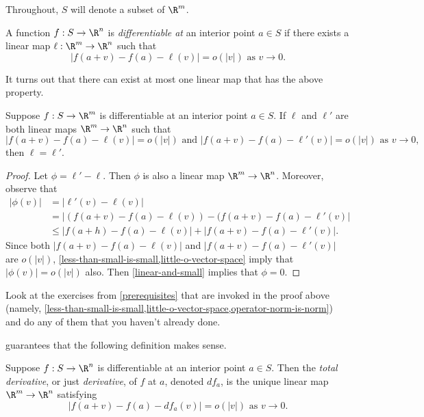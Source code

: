 Throughout, $S$ will denote a subset of $\R^m$. 

\begin{definition}
	A function $f : S \to \R^n$ is \emph{differentiable at} an interior point $a \in S$ if there exists a linear map $\ell : \R^m \to \R^n$ such that
	\[ |f(a+v)-f(a)-\ell(v)| = o(|v|) \text{ as } v \to 0. \]
\end{definition}

It turns out that there can exist at most one linear map that has the above property. 

\begin{lemma} \label{differentiable-unique}
	Suppose $f : S \to \R^m$ is differentiable at an interior point $a \in S$. If $\ell$ and $\ell'$ are both linear maps $\R^m \to \R^n$ such that
	\[ |f(a+v) - f(a) - \ell(v)| = o(|v|) \text { and } |f(a+v) - f(a) - \ell'(v)| = o(|v|) \text{ as } v \to 0, \]
	then $\ell = \ell'$. 
\end{lemma}

\begin{proof}
	Let $\phi = \ell' - \ell$. Then $\phi$ is also a linear map $\R^m \to \R^n$. Moreover, observe that
	\[ \begin{aligned} |\phi(v)| &= |\ell'(v) - \ell(v)| \\
	&= |(f(a+v)-f(a)-\ell(v))-(f(a+v)-f(a)-\ell'(v)| \\
	&\leq |f(a+h)-f(a)-\ell(v)| + |f(a+v)-f(a)-\ell'(v)|. \end{aligned} \]
	Since both $|f(a+v)-f(a)-\ell(v)|$ and $|f(a+v)-f(a)-\ell'(v)|$ are $o(|v|)$, \cref{less-than-small-is-small,little-o-vector-space} imply that $|\phi(v)| = o(|v|)$ also. Then \cref{linear-and-small} implies that $\phi = 0$. 
\end{proof}

\begin{exercise}
	Look at the exercises from \cref{prerequisites} that are invoked in the proof above (namely, \cref{less-than-small-is-small,little-o-vector-space,operator-norm-is-norm}) and do any of them that you haven't already done.
\end{exercise}

 guarantees that the following definition makes sense.  

\begin{definition}
	Suppose $f : S \to \R^n$ is differentiable at an interior point $a \in S$. Then the \emph{total derivative}, or just \emph{derivative}, of $f$ at $a$, denoted $df_a$, is the unique linear map $\R^m \to \R^n$ satisfying
	\[ |f(a+v)-f(a)-df_a(v)| = o(|v|) \text{ as } v \to 0.  \]
\end{definition}

